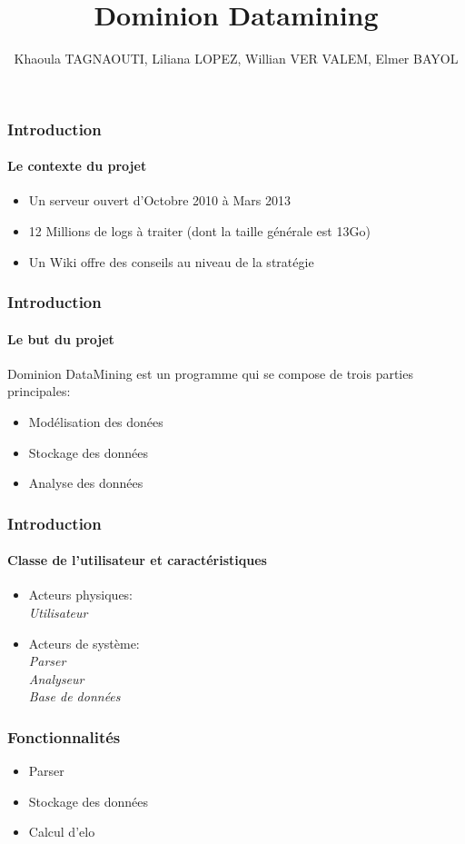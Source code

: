 \documentclass{beamer}
\title{Dominion Datamining}
\author[TAGNAOUTI, LOPEZ, VER VALEM, BAYOL]{Khaoula TAGNAOUTI, Liliana LOPEZ, Willian VER VALEM, Elmer BAYOL}
\begin{document}
\maketitle

\begin{frame}
  \frametitle{Introduction}
  \framesubtitle{Le contexte du projet}
  
  \begin{itemize}
  \item Un serveur ouvert d'Octobre 2010 à Mars 2013
    \item 12 Millions de logs à traiter (dont la taille générale est 13Go)
    \item Un Wiki offre des conseils au niveau de la stratégie
  
  \end{itemize}
\end{frame}
  
  \begin{frame}
  \frametitle{Introduction}
  \framesubtitle{Le but du projet}
  Dominion DataMining est un programme qui se compose de trois parties principales:
  \begin{itemize}
  \item Modélisation des donées
  \item Stockage des données
  \item Analyse des données
  \end{itemize}
\end{frame}

\begin{frame}
  \frametitle{Introduction}
  \framesubtitle{Classe de l'utilisateur et caractéristiques}
 
  \begin{itemize}
    \item Acteurs physiques:
     ~~\\
     \textit{Utilisateur}
      ~~\\
    \item Acteurs de système:  
      ~~\\
     \textit{Parser}
       ~~\\
     \textit{Analyseur}
      ~~\\
     \textit{Base de données}
      ~~\\
     
  \end{itemize}

\end{frame}
  

\begin{frame}
  \frametitle{Fonctionnalités}
  \begin{itemize}
  \item Parser
  \item Stockage des données
  \item Calcul d'elo
  \end{itemize}
\end{frame}
\end{document}
